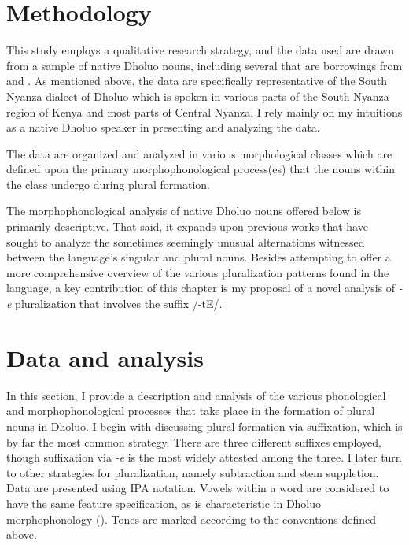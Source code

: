 \documentclass[output=paper,colorlinks,citecolor=brown]{langscibook}
\begin{document}
\section{Methodology} \label{04_Section3}

This study employs a qualitative research strategy, and the data used are drawn from a sample of native Dholuo nouns, including several that are borrowings from  and . As mentioned above, the data are specifically representative of the South Nyanza dialect of Dholuo which is spoken in various parts of the South Nyanza region of Kenya and most parts of Central Nyanza. I rely mainly on my intuitions as a native Dholuo speaker in presenting and analyzing the data.

The data are organized and analyzed in various morphological classes which are defined upon the primary morphophonological process(es) that the nouns within the class undergo during plural formation. 

The morphophonological analysis of native Dholuo nouns offered below is primarily descriptive. That said, it expands upon previous works that have sought to analyze the sometimes seemingly unusual alternations witnessed between the language's singular and plural nouns. Besides attempting to offer a more comprehensive overview of the various pluralization patterns found in the language, a key contribution of this chapter is my proposal of a novel analysis of \textit{-e} pluralization that involves the suffix /-tE/.

\section{Data and analysis} \label{04_Section4}\largerpage

In this section, I provide a description and analysis of the various phonological and morphophonological processes that take place in the formation of plural nouns in Dholuo. I begin with discussing plural formation via suffixation, which is by far the most common strategy. There are three different suffixes employed, though suffixation via \textit{-e} is the most widely attested among the three. I later turn to other strategies for pluralization, namely subtraction and stem suppletion. Data are presented using IPA notation. Vowels within a word are considered to have the same  feature specification, as is characteristic in Dholuo morphophonology (\cite{Okelo2020}). Tones are marked according to the conventions defined above. 
\end{document}
